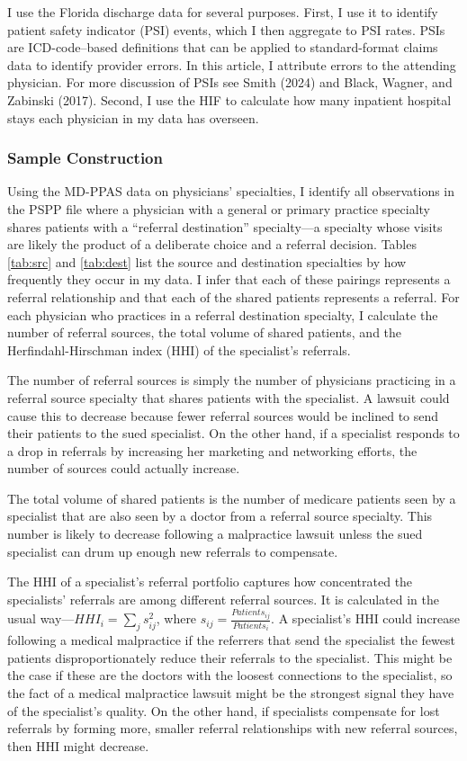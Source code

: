 \documentclass[
  12pt,
]{article}
\begin{document}
I use the Florida discharge data for several purposes. First, I use it to identify patient safety indicator (PSI) events, which I then aggregate to PSI rates. PSIs are ICD-code--based definitions that can be applied to standard-format claims data to identify provider errors. In this article, I attribute errors to the attending physician. For more discussion of PSIs see Smith (2024) and Black, Wagner, and Zabinski (2017). Second, I use the HIF to calculate how many inpatient hospital stays each physician in my data has overseen.

\hypertarget{sample-construction}{%
\subsubsection{Sample Construction}\label{sample-construction}}

Using the MD-PPAS data on physicians' specialties, I identify all observations in the PSPP file where a physician with a general or primary practice specialty shares patients with a ``referral destination'' specialty---a specialty whose visits are likely the product of a deliberate choice and a referral decision. Tables \ref{tab:src} and \ref{tab:dest} list the source and destination specialties by how frequently they occur in my data. I infer that each of these pairings represents a referral relationship and that each of the shared patients represents a referral. For each physician who practices in a referral destination specialty, I calculate the number of referral sources, the total volume of shared patients, and the Herfindahl-Hirschman index (HHI) of the specialist's referrals.

The number of referral sources is simply the number of physicians practicing in a referral source specialty that shares patients with the specialist. A lawsuit could cause this to decrease because fewer referral sources would be inclined to send their patients to the sued specialist. On the other hand, if a specialist responds to a drop in referrals by increasing her marketing and networking efforts, the number of sources could actually increase.

The total volume of shared patients is the number of medicare patients seen by a specialist that are also seen by a doctor from a referral source specialty. This number is likely to decrease following a malpractice lawsuit unless the sued specialist can drum up enough new referrals to compensate.

The HHI of a specialist's referral portfolio captures how concentrated the specialists' referrals are among different referral sources. It is calculated in the usual way---\(HHI_i=\sum_{j}s^2_{ij}\), where \(s_{ij}=\frac{Patients_{ij}}{Patients_i}\). A specialist's HHI could increase following a medical malpractice if the referrers that send the specialist the fewest patients disproportionately reduce their referrals to the specialist. This might be the case if these are the doctors with the loosest connections to the specialist, so the fact of a medical malpractice lawsuit might be the strongest signal they have of the specialist's quality. On the other hand, if specialists compensate for lost referrals by forming more, smaller referral relationships with new referral sources, then HHI might decrease.
\end{document}
